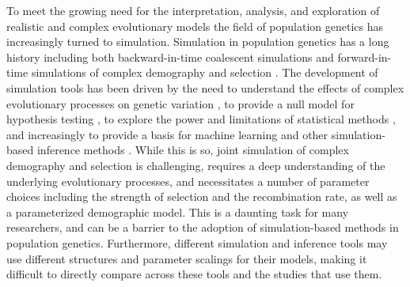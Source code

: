 \documentclass[hidelinks]{article}
\begin{document}
    To meet the growing need for the interpretation,
    analysis, and exploration of realistic and complex evolutionary models
    the field of population genetics has increasingly turned to simulation.
    Simulation in population genetics has a long history 
    including both backward-in-time coalescent simulations
    \citep{kingman1982genealogy,hudson1983testing, hudson1990gene}
    and forward-in-time simulations of complex demography and selection
    \citep[e.g.,][]{gillespie1984molecular, hernandez2008flexible, thornton2014c++, haller2019slim}. 
    The development of simulation tools has been driven by the need to
    understand the effects of complex evolutionary processes on genetic
    variation \citep[e.g.,][]{peischl2013accumulation, thornton2019polygenic, galloway2020few, zhang2020impact}, 
     to provide a null model for hypothesis testing
    \citep[e.g.,][]{hudson1992statistical,hudson1994evidence,sabeti2002detecting},
    to explore the power and limitations of statistical methods \citep[e.g.,][]{przeworski2002signature},
    and increasingly to provide a basis for machine learning and other
    simulation-based inference methods 
    \citep[e.g.,][]{beaumont2002approximate,lin2011distinguishing,kern2018diplos,mughal2019localizing,sanchez2021deep,wang2021automatic, zhang2023maladapt, smith2023dispersenn2}.
    While this is so, joint simulation of complex demography and selection
    is challenging,  requires a deep understanding of the underlying
    evolutionary processes, and necessitates a number of parameter choices including
    the strength of selection and the
    recombination rate, as well as a parameterized demographic model.
    This is a daunting task for many researchers, and can be a barrier to
    the adoption of simulation-based methods in population genetics.
    Furthermore, different simulation and inference tools may use different structures
    and parameter scalings for their models,
    making it difficult to directly compare across these tools and the studies that use them.
    
\end{document}
